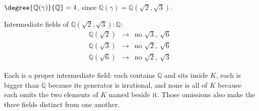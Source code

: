 \documentclass[11pt]{article}
\begin{document}
\begin{solution}
  $\degree{\mathbb{Q}(\gamma)}{\mathbb{Q}} = 4$, since
  $\mathbb{Q}(\gamma) = \mathbb{Q}(\sqrt{2},\sqrt{3})$.

  Intermediate fields of $\mathbb{Q}(\sqrt{2},\sqrt{3}) : \mathbb{Q}$:
  \[
    \begin{array}{lcl}
      \mathbb{Q}(\sqrt{2}) & \longrightarrow & \text{no } \sqrt{3},\ \sqrt{6}\\
      \mathbb{Q}(\sqrt{3}) & \longrightarrow & \text{no } \sqrt{2},\ \sqrt{6}\\
      \mathbb{Q}(\sqrt{6}) & \longrightarrow & \text{no } \sqrt{2},\ \sqrt{3}
    \end{array}
  \]

  Each is a proper intermediate field: each contains $\mathbb{Q}$ and sits
  inside $K$, each is bigger than $\mathbb{Q}$ because its generator is
  irrational, and none is all of $K$ because each omits the two elements of $K$
  named beside it. Those omissions also make the three fields distinct from one
  another.
\end{solution}
\end{document}
